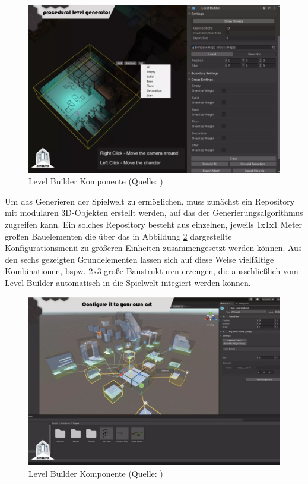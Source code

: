\begin{figure}[ht]
\centering
\includegraphics[width=1\linewidth]{content/pictures/FirstSteps01.png}
\caption{Level Builder Komponente (Quelle: \citealp{alasl_autolevel_2022})}
\label{fig:level_builder_edit}
\end{figure}

Um das Generieren der Spielwelt zu ermöglichen, muss zunächst ein Repository mit modularen \ac{3D}-Objekten erstellt werden, auf das der Generierungsalgorithmus zugreifen kann. Ein solches Repository besteht aus einzelnen, jeweils 1x1x1 Meter großen Bauelementen die über das in Abbildung \ref{fig:repository-generator} dargestellte Konfigurationsmenü zu größeren Einheiten zusammengesetzt werden können. Aus den sechs gezeigten Grundelementen lassen sich auf diese Weise vielfältige Kombinationen, bspw. 2x3 große Baustrukturen erzeugen, die ausschließlich vom Level-Builder automatisch in die Spielwelt integiert werden können.

\begin{figure}[ht]
\centering
\includegraphics[width=1\linewidth]{content/pictures/FirstSteps02.png}
\caption{Level Builder Komponente (Quelle: \citealp{alasl_autolevel_2022})}
\label{fig:repository-generator}
\end{figure}

